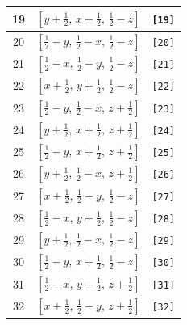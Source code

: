 \documentclass[fleqn,8pt]{jsarticle}
\begin{document}
\begin{longtable}{ccc}
19 & $\left[ y + \frac{1}{2},\, x + \frac{1}{2},\, \frac{1}{2} - z \right]$ & {\tt [19]} \\ \hline
20 & $\left[ \frac{1}{2} - y,\, \frac{1}{2} - x,\, \frac{1}{2} - z \right]$ & {\tt [20]} \\ \hline
21 & $\left[ \frac{1}{2} - x,\, \frac{1}{2} - y,\, \frac{1}{2} - z \right]$ & {\tt [21]} \\ \hline
22 & $\left[ x + \frac{1}{2},\, y + \frac{1}{2},\, \frac{1}{2} - z \right]$ & {\tt [22]} \\ \hline
23 & $\left[ \frac{1}{2} - y,\, \frac{1}{2} - x,\, z + \frac{1}{2} \right]$ & {\tt [23]} \\ \hline
24 & $\left[ y + \frac{1}{2},\, x + \frac{1}{2},\, z + \frac{1}{2} \right]$ & {\tt [24]} \\ \hline
25 & $\left[ \frac{1}{2} - y,\, x + \frac{1}{2},\, z + \frac{1}{2} \right]$ & {\tt [25]} \\ \hline
26 & $\left[ y + \frac{1}{2},\, \frac{1}{2} - x,\, z + \frac{1}{2} \right]$ & {\tt [26]} \\ \hline
27 & $\left[ x + \frac{1}{2},\, \frac{1}{2} - y,\, \frac{1}{2} - z \right]$ & {\tt [27]} \\ \hline
28 & $\left[ \frac{1}{2} - x,\, y + \frac{1}{2},\, \frac{1}{2} - z \right]$ & {\tt [28]} \\ \hline
29 & $\left[ y + \frac{1}{2},\, \frac{1}{2} - x,\, \frac{1}{2} - z \right]$ & {\tt [29]} \\ \hline
30 & $\left[ \frac{1}{2} - y,\, x + \frac{1}{2},\, \frac{1}{2} - z \right]$ & {\tt [30]} \\ \hline
31 & $\left[ \frac{1}{2} - x,\, y + \frac{1}{2},\, z + \frac{1}{2} \right]$ & {\tt [31]} \\ \hline
32 & $\left[ x + \frac{1}{2},\, \frac{1}{2} - y,\, z + \frac{1}{2} \right]$ & {\tt [32]} \\
\end{longtable}
\end{document}
